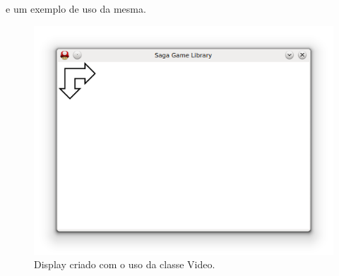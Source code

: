 %
%
e um exemplo de uso da mesma.
%
%

%
%
\begin{figure}[H]
    \centering
    \includegraphics[scale = 0.40]{Imagens/display.png}
    \caption{Display criado com o uso da classe Video.}
    \label{display}
\end{figure}
%
%
